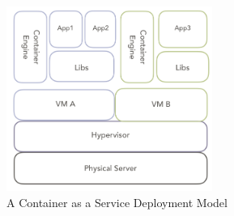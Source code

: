 \begin{figure}
	\centering
	\includegraphics[width=0.6\textwidth]{pics/container.png}
	\caption{A Container as a Service Deployment Model}
	\label{fig:container}
\end{figure}






